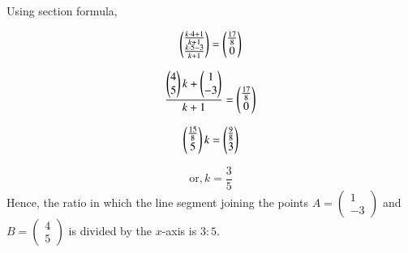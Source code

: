 \documentclass[journal]{IEEEtran}
\begin{document}
   Using section formula, 

   $$\begin{pmatrix}\frac{k \cdot 4+1}{k+1} \\ \frac{k \cdot 5-3}{k+1}\end{pmatrix}=\begin{pmatrix}\frac{17}{8} \\ 0 \end{pmatrix}$$

   $$ \frac{\begin{pmatrix}4 \\ 5\end{pmatrix}k + \begin{pmatrix}1 \\ -3 \end{pmatrix}}{k+1} = \begin{pmatrix}\frac{17}{8} \\ 0 \end{pmatrix}$$

   $$ \begin{pmatrix}\frac{15}{8} \\ 5 \end{pmatrix}k = \begin{pmatrix}\frac{9}{8} \\ 3\end{pmatrix}   $$

   $$ \text{or}, k=\frac{3}{5} $$
   Hence, the ratio in which the line segment joining the points $A =\begin{pmatrix} 1 \\ -3 \end{pmatrix}$ and $B=\begin{pmatrix} 4 \\ 5 \end{pmatrix}$ is divided by the $x$-axis is $3:5$.
\end{document}
